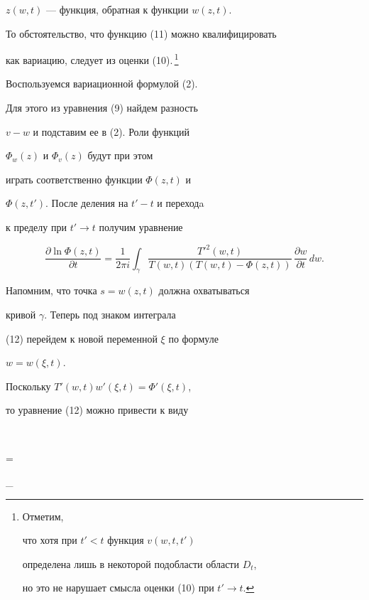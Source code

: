 \begin{pf}
\begin{equation}
\end{equation}


$z(w,t)$ --- функция, обратная к функции $w(z,t)$. 


То обстоятельство, что функцию (11) можно квалифицировать


как вариацию, следует из оценки (10).\,\footnote{Отметим, 


что хотя при $t'<t$ функция $v(w,t,t')$


определена лишь в некоторой подобласти области $D_{t}$, 


но это не нарушает смысла оценки (10) при $t'\to t$.}





Воспользуемся вариационной формулой (2).


Для этого из уравнения (9) найдем разность


$v-w$ и подставим ее в (2). Роли функций


$\Phi_{w}(z)$ и $\Phi_{v}(z)$ будут при этом


играть соответственно функции $\Phi(z,t)$ и 


$\Phi(z,t')$. После деления на $t'-t$ и переходa


к пределу при $t'\to t$ получим уравнение


\begin{equation}


\frac{\partial\ln\Phi(z,t)}{\partial t}=


\frac{1}{2\pi i}


\int_{\gamma}


\frac{{T'}^{2}(w,t)}{T(w,t)(T(w,t)-\Phi(z,t))}\,


\frac{\partial w}{\partial t}\,dw.


\end{equation}


Напомним, что точка $s=w(z,t)$ должна охватываться 


кривой $\gamma$. Теперь под знаком интеграла


(12) перейдем к новой переменной $\xi$ по формуле


$w=w(\xi,t)$.


Поскольку $T'(w,t) w'(\xi,t)=\Phi'(\xi,t)$,


то уравнение (12) можно привести к виду


$$


=




\int_{\beta}



\end{pf}
